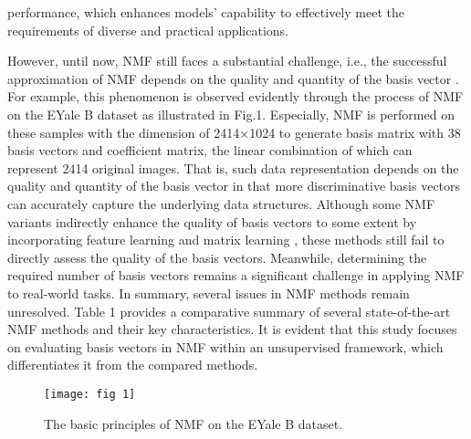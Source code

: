 \documentclass[a4paper,fleqn]{cas-sc}
\begin{document}
performance, which enhances models' capability to effectively meet the requirements of diverse and practical applications.

However, until now, NMF still faces a substantial challenge, i.e., the successful approximation of NMF depends on the quality and quantity of the basis vector \cite{7}. For example, this phenomenon is observed evidently through the process of NMF on the EYale B dataset \cite{24} as illustrated in Fig.1. Especially, NMF is performed on these samples with the dimension of 2414$\times$1024 to generate basis matrix with 38 basis vectors and coefficient matrix, the linear combination of which can represent 2414 original images. That is, such data representation  depends on the quality and quantity of the basis vector in that more discriminative basis vectors can accurately capture the underlying data structures. Although some NMF variants indirectly enhance the quality of basis vectors to some extent by incorporating feature learning and matrix learning \cite{45,46,47}, these methods still fail to directly assess the quality of the basis vectors. Meanwhile, determining the required number of basis vectors remains a significant challenge in applying NMF to real-world tasks. In summary, several issues in NMF methods remain unresolved. Table 1 provides a comparative summary of several state-of-the-art NMF methods and their key characteristics. It is evident that this study focuses on evaluating basis vectors in NMF within an unsupervised framework, which differentiates it from the compared methods.


\begin{figure*}[!t]
	\centering
	\texttt{[image: fig 1]}
	\caption{The basic principles of NMF on the EYale B dataset.}
	\label{fig_1}
\end{figure*}
\end{document}

